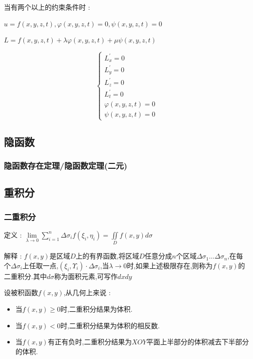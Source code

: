 \documentclass[UTF8,12pt]{ctexbook}
\newcommand{\limNormal}[1]{\lim\limits_{#1}}
\newcommand{\derivative}{^\prime}
\newcommand{\upDownSum}[2]{\sum\limits_{#2}^{#1}}
\newcommand{\defFunction}[1]{f(#1)}
\newcommand{\doubleIntegralOnZone}[1]{\iint\limits_{#1}}
\begin{document}
{{{{    当有两个以上的约束条件时 :

    $u = \defFunction{x,y,z,t},\varphi(x,y,z,t) = 0,\psi(x,y,z,t) = 0$

    $L = \defFunction{x,y,z,t} + \lambda\varphi(x,y,z,t) + \mu\psi(x,y,z,t)$

    $$
      \begin{cases}
        L\derivative_x = 0   \\
        L\derivative_y = 0   \\
        L\derivative_z = 0   \\
        L\derivative_t = 0   \\
        \varphi(x,y,z,t) = 0 \\
        \psi(x,y,z,t) = 0
      \end{cases}
    $$
  }%

}%

\subsection{隐函数}{

  \subsubsection{隐函数存在定理/隐函数定理(二元)}{
  }%

}%

\subsection{重积分}{

  \subsubsection{二重积分}{
    定义 : $\limNormal{\lambda \to 0}\upDownSum{n}{i = 1}\Delta\sigma_i\defFunction{\xi_i,\eta_i} = \doubleIntegralOnZone{D}\defFunction{x,y}d\sigma$

    解释 : $\defFunction{x,y}$是区域$D$上的有界函数,将区域$D$任意分成$n$个区域$\Delta\sigma_1\dots\Delta\sigma_n$,在每个$\Delta\sigma_i$上任取一点,$(\xi_i,\varUpsilon_i)\cdot\Delta\sigma_i$,当$\lambda \to 0$时,如果上述极限存在,则称为$f(x,y)$的二重积分.其中$d\sigma$称为面积元素,可写作$dxdy$

    设被积函数$\defFunction{x,y}$,从几何上来说 :
    \begin{itemize}
      \item 当$\defFunction{x,y} \geq 0$时,二重积分结果为体积.
      \item 当$\defFunction{x,y} < 0$时,二重积分结果为体积的相反数.
      \item 当$\defFunction{x,y}$有正有负时,二重积分结果为$XOY$平面上半部分的体积减去下半部分的体积.
    \end{itemize}
  }%

}}}
\end{document}
